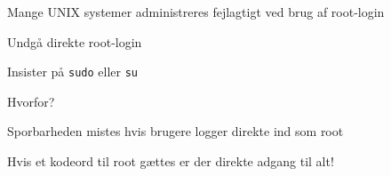 \documentclass[Screen16to9,17pt]{foils}
\begin{document}


\begin{list1}
\item Mange UNIX systemer administreres fejlagtigt ved brug af
  root-login
\item Undgå direkte root-login
\item Insister på \verb+sudo+ eller \verb+su+
\item Hvorfor?
\begin{list2}
\item Sporbarheden mistes hvis brugere logger direkte ind som root
\item Hvis et kodeord til root gættes er der direkte adgang til alt!
\end{list2}
\end{list1}


\slidenext
\end{document}
